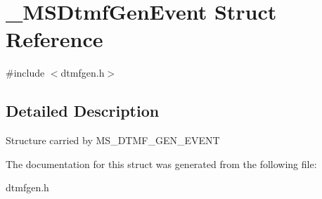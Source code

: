 \section{\-\_\-\-M\-S\-Dtmf\-Gen\-Event Struct Reference}
\label{struct__MSDtmfGenEvent}


{\ttfamily \#include $<$dtmfgen.\-h$>$}



\subsection{Detailed Description}
Structure carried by M\-S\-\_\-\-D\-T\-M\-F\-\_\-\-G\-E\-N\-\_\-\-E\-V\-E\-N\-T 

The documentation for this struct was generated from the following file\-:\begin{DoxyCompactItemize}
\item 
dtmfgen.\-h\end{DoxyCompactItemize}
